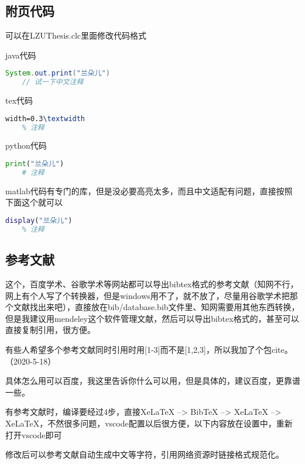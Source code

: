 \documentclass[AutoFakeBold]{LZUThesis}
\begin{document}
\subsection{附页代码} %
\label{sub:附页代码}
可以在LZUThesis.clc里面修改代码格式

java代码
\begin{lstlisting}[language = java]
    System.out.print("兰朵儿")
    // 试一下中文注释
\end{lstlisting}


tex代码
\begin{lstlisting}[language = tex]
    width=0.3\textwidth
    % 注释
\end{lstlisting}

python代码
\begin{lstlisting}[language = python]
    print("兰朵儿")
    # 注释
\end{lstlisting}

matlab代码有专门的库，但是没必要高亮太多，而且中文适配有问题，直接按照下面这个就可以
\begin{lstlisting}[language = matlab]
    display("兰朵儿")
    % 注释
\end{lstlisting}


\subsection{参考文献} %
\label{sub:参考文献}

这个，百度学术、谷歌学术等网站都可以导出bibtex格式的参考文献（知网不行，网上有个人写了个转换器，但是windows用不了，就不放了，尽量用谷歌学术把那个文献找出来吧），直接放在bib/database.bib文件里、知网需要用其他东西转换，但是我建议用mendeley这个软件管理文献，然后可以导出bibtex格式的，甚至可以直接复制引用，很方便\cite{partl2016, tenne1992polyhedral, tussyadiah2015hotels}。

有些人希望多个参考文献同时引用时用[1-3]而不是[1,2,3]，所以我加了个包cite。（2020-5-18）

具体怎么用可以百度，我这里告诉你什么可以用，但是具体的，建议百度，更靠谱一些。


有参考文献时，编译要经过4步，直接XeLaTeX --> BibTeX --> XeLaTeX --> XeLaTeX，不然很多问题，vscode配置以后很方便，以下内容放在设置中，重新打开vscode即可

修改后可以参考文献自动生成中文等字符\cite{partl2021}\cite{partl2022}\cite{partl2022-2}，引用网络资源时链接格式规范化\cite{intelnewsroomIntelUnveils12th2021,wilsonHistoryDevelopmentParallel1994}。
\end{document}
